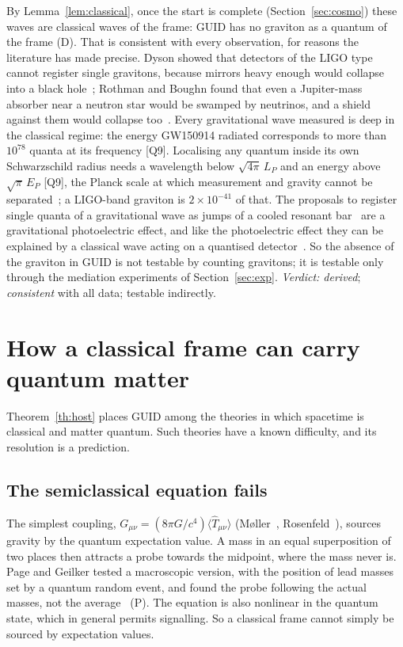 \documentclass[11pt,a4paper]{article}
\theoremstyle{definition}
\theoremstyle{remark}
\newcommand{\chk}[1]{\textsf{[#1]}}
\newcommand{\tagD}{\textsf{(D)}}
\newcommand{\tagP}{\textsf{(P)}}
\theoremstyle{definition}
\begin{document}
By Lemma~\ref{lem:classical}, once the start is complete (Section~\ref{sec:cosmo}) these waves are classical waves of the frame: GUID has no graviton as a quantum
of the frame \tagD. That is consistent with every observation, for reasons the literature has made precise. Dyson showed that detectors of
the LIGO type cannot register single gravitons, because mirrors heavy enough would collapse into a black hole~\cite{dyson}; Rothman and
Boughn found that even a Jupiter-mass absorber near a neutron star would be swamped by neutrinos, and a shield against them would collapse
too~\cite{rb}. Every gravitational wave measured is deep in the classical regime: the energy GW150914 radiated corresponds to more than $10^{78}$
quanta at its frequency \chk{Q9}. Localising any quantum inside its own Schwarzschild radius needs a wavelength below $\sqrt{4\pi}\,L_P$ and
an energy above $\sqrt\pi\,E_P$ \chk{Q9}, the Planck scale at which measurement and gravity cannot be separated~\cite{mead}; a LIGO-band
graviton is $2\times10^{-41}$ of that. The proposals to register single quanta of a gravitational wave as jumps of a cooled resonant
bar~\cite{tobar} are a gravitational photoelectric effect, and like the photoelectric effect they can be explained by a classical wave acting
on a quantised detector~\cite{cdr}. So the absence of the graviton in GUID is not testable by counting gravitons; it is testable only
through the mediation experiments of Section~\ref{sec:exp}. \emph{Verdict: derived}; \emph{consistent} with all data; testable indirectly.

\section{How a classical frame can carry quantum matter}\label{sec:cq}

Theorem~\ref{th:host} places GUID among the theories in which spacetime is classical and matter quantum. Such theories have a known
difficulty, and its resolution is a prediction.

\subsection{The semiclassical equation fails}

The simplest coupling, $G_{\mu\nu}=(8\pi G/c^4)\langle\hat T_{\mu\nu}\rangle$ (M{\o}ller~\cite{moller}, Rosenfeld~\cite{rosenfeld63}),
sources gravity by the quantum expectation value. A mass in an equal superposition of two places then attracts a probe towards the midpoint,
where the mass never is. Page and Geilker tested a macroscopic version, with the position of lead masses set by a quantum random event, and
found the probe following the actual masses, not the average~\cite{pagegeilker} \tagP. The equation is also nonlinear in the quantum state,
which in general permits signalling. So a classical frame cannot simply be sourced by expectation values.
\end{document}
